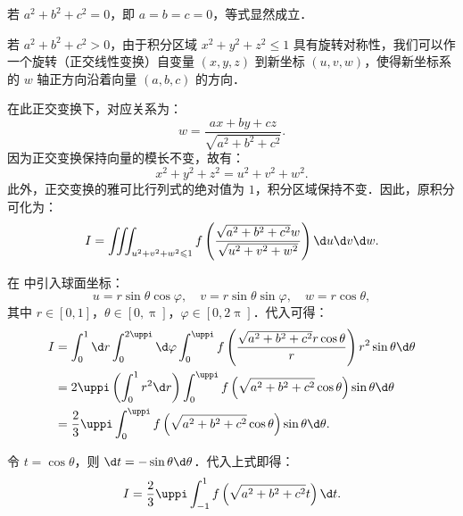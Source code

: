 \begin{myproof}
    若 $a^2 + b^2 + c^2 = 0$，即 $a = b = c = 0$，等式显然成立．

    若 $a^2 + b^2 + c^2 > 0$，由于积分区域 $x^2+y^2+z^2 \leqslant 1$ 具有旋转对称性，我们可以作一个旋转（正交线性变换）自变量 $(x, y, z)$ 到新坐标 $(u, v, w)$，使得新坐标系的 $w$ 轴正方向沿着向量 $(a, b, c)$ 的方向．

    在此正交变换下，对应关系为：
    \begin{equation}
        w = \frac{ax + by + cz}{\sqrt{a^2+b^2+c^2}}.
    \end{equation}
    因为正交变换保持向量的模长不变，故有：
    \begin{equation}
        x^2 + y^2 + z^2 = u^2 + v^2 + w^2.
    \end{equation}
    此外，正交变换的雅可比行列式的绝对值为 $1$，积分区域保持不变．因此，原积分可化为：
    \begin{equation}\label{eq:integral-transformed-1}
        I = \iiint_{u^2+v^2+w^2 \leqslant 1} f\left( \frac{\sqrt{a^2+b^2+c^2} w}{\sqrt{u^2+v^2+w^2}} \right) \d u \d v \d w.
    \end{equation}

    在  中引入球面坐标：
    \begin{equation}
        u = r \sin\theta \cos\varphi, \quad v = r \sin\theta \sin\varphi, \quad w = r \cos\theta,
    \end{equation}
    其中 $r \in [0, 1]$，$\theta \in [0, \uppi]$，$\varphi \in [0, 2\uppi]$．代入可得：
    \begin{equation}
        \begin{aligned}
            I & = \int_{0}^{1} \d r \int_{0}^{2\uppi} \d\varphi \int_{0}^{\uppi} f\left( \frac{\sqrt{a^2+b^2+c^2} r \cos\theta}{r} \right) r^2 \sin\theta \d\theta \\
              & = 2\uppi \left( \int_{0}^{1} r^2 \d r \right) \int_{0}^{\uppi} f\left( \sqrt{a^2 + b^2 + c^2} \cos\theta \right) \sin\theta \d\theta               \\
              & = \frac{2}{3} \uppi \int_{0}^{\uppi} f\left( \sqrt{a^2 + b^2 + c^2} \cos\theta \right) \sin\theta \d\theta.
        \end{aligned}
    \end{equation}

    令 $t = \cos\theta$，则 $\d t = -\sin\theta \d\theta$．代入上式即得：
    \begin{equation}
        I = \frac{2}{3} \uppi \int_{-1}^{1} f\left( \sqrt{a^2 + b^2 + c^2} t \right) \d t.
    \end{equation}
\end{myproof}

